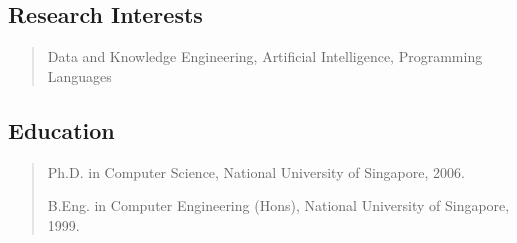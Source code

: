 \documentclass[10pt,a4paper]{article}
\begin{document}
\subsection*{Research Interests}
\begin{quote}
Data and Knowledge Engineering, Artificial Intelligence, Programming Languages
\end{quote}


%
\subsection*{Education}
\begin{quote}
Ph.D. in Computer Science, National University of Singapore, 2006.

B.Eng. in Computer Engineering (Hons), National University of Singapore, 1999.
\end{quote}
\end{document}
